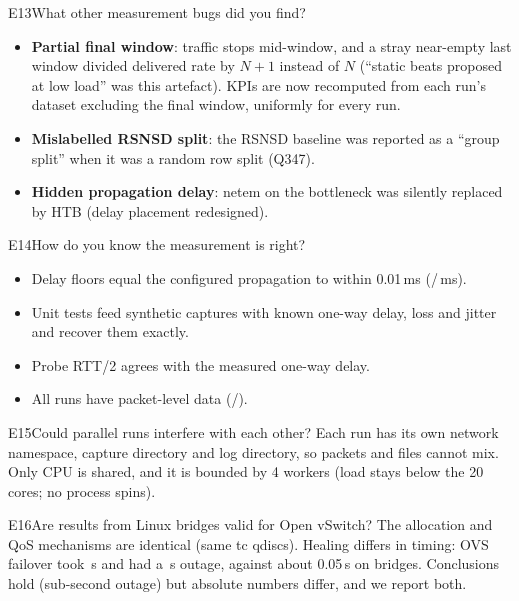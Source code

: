 \begin{qa}{E13}{What other measurement bugs did you find?}
\begin{itemize}
\item \textbf{Partial final window}: traffic stops mid-window, and a stray near-empty last window divided delivered rate by
$N{+}1$ instead of $N$ (``static beats proposed at low load'' was this artefact). KPIs are now recomputed from each
run's dataset excluding the final window, uniformly for every run.
\item \textbf{Mislabelled RSNSD split}: the RSNSD baseline was reported as a ``group split'' when it was a random row
split (Q347).
\item \textbf{Hidden propagation delay}: netem on the bottleneck was silently replaced by HTB (delay placement redesigned).
\end{itemize}
\end{qa}

\begin{qa}{E14}{How do you know the measurement is right?}
\begin{itemize}
\item Delay floors equal the configured propagation to within 0.01\,ms (\NFloorEdge/\NFloorCore\,ms).
\item Unit tests feed synthetic captures with known one-way delay, loss and jitter and recover them exactly.
\item Probe RTT/2 agrees with the measured one-way delay.
\item All runs have packet-level data (\NRunsPcap/\NRuns).
\end{itemize}
\end{qa}

\begin{qa}{E15}{Could parallel runs interfere with each other?}
Each run has its own network namespace, capture directory and log directory, so packets and files cannot mix. Only
CPU is shared, and it is bounded by 4 workers (load stays below the 20 cores; no process spins).
\end{qa}

\begin{qa}{E16}{Are results from Linux bridges valid for Open vSwitch?}
The allocation and QoS mechanisms are identical (same tc qdiscs). Healing differs in timing: OVS failover took
\NOvsMttrAfter\,s and had a \NOvsOutageAfter\,s outage, against about 0.05\,s on bridges. Conclusions hold (sub-second
outage) but absolute numbers differ, and we report both.
\end{qa}

